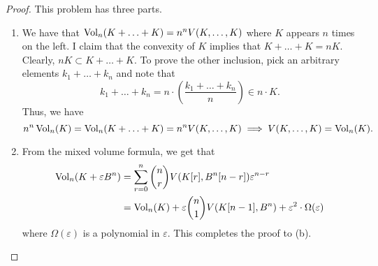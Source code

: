 \documentclass[12pt]{article}
\begin{document}
\begin{proof}
	This problem has three parts. 
	\begin{enumerate}[label = (\alph*)]
		\item We have that $\operatorname{Vol}_n(K + \ldots + K) = n^n V(K, \ldots, K)$ where $K$ appears $n$ times on the left. I claim that the convexity of $K$ implies that $K + \ldots + K = n K$. Clearly, $nK \subset K + \ldots + K$. To prove the other inclusion, pick an arbitrary elements $k_1 + \ldots + k_n$ and note that 
		\[
			k_1 + \ldots + k_n = n \cdot \left( \frac{k_1 + \ldots + k_n}{n} \right ) \in n \cdot K. 
		\]
		Thus, we have 
		\[
			n^n \operatorname{Vol}_n(K) = \operatorname{Vol}_n(K + \ldots + K) = n^n V(K, \ldots, K) \implies V(K, \ldots, K) = \operatorname{Vol}_n(K). 
		\]
		\item From the mixed volume formula, we get that 
		\begin{align*}
			\operatorname{Vol}_n(K + \varepsilon B^n) & = \sum_{r = 0}^n \binom{n}{r} V(K[r], B^n[n-r]) \varepsilon^{n-r} \\
			& = \operatorname{Vol}_n(K) + \varepsilon \binom{n}{1} V(K[n-1], B^n) + \varepsilon^2 \cdot \Omega(\varepsilon)
		\end{align*}
		where $\Omega(\varepsilon)$ is a polynomial in $\varepsilon$. This completes the proof to (b). 


\end{enumerate}
\end{proof}
\end{document}
